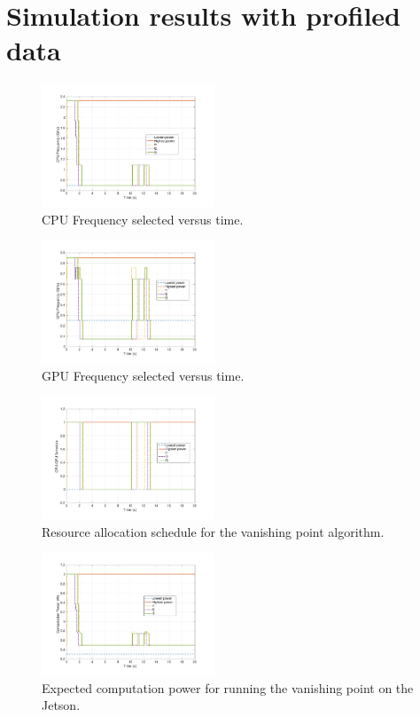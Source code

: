 \section{Simulation results with profiled data}
\label{sec:simResults}


\begin{figure}[hbtp]
\centering
\includegraphics[width=0.46\textwidth]{../simulations/figs/CPUF.pdf}
\caption{CPU Frequency selected versus time.}
\label{fig:cpuf} %
\end{figure}


\begin{figure}[hbtp]
\centering
\includegraphics[width=0.46\textwidth]{../simulations/figs/GPUF.pdf}
\caption{GPU Frequency selected versus time.}
\label{fig:gpuf} %
\end{figure}

\begin{figure}[hbtp]
\centering
\includegraphics[width=0.46\textwidth]{../simulations/figs/schedule.pdf}
\caption{Resource allocation schedule for the vanishing point algorithm.}
\label{fig:schedule} %
\end{figure}

\begin{figure}[hbtp]
\centering
\includegraphics[width=0.46\textwidth]{../simulations/figs/power.pdf}
\caption{Expected computation power for running the vanishing point on the Jetson.}
\label{fig:power} %
\end{figure}




